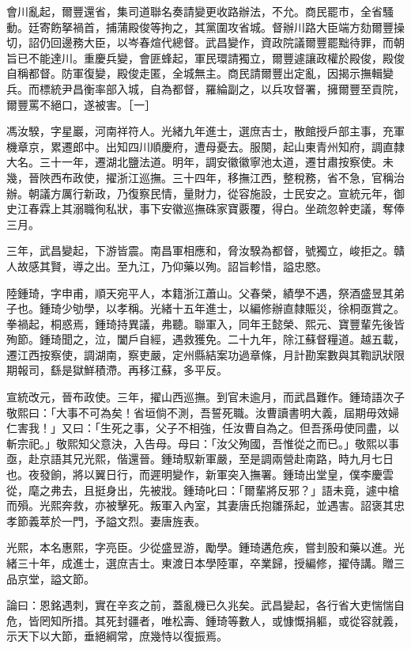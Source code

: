 \begin{pinyinscope}
會川亂起，爾豐還省，集司道聯名奏請變更收路辦法，不允。商民罷市，全省騷動。廷寄飭拏禍首，捕蒲殿俊等拘之，其黨圍攻省城。督辦川路大臣端方劾爾豐操切，詔仍回邊務大臣，以岑春煊代總督。武昌變作，資政院議爾豐罷黜待罪，而朝旨已不能達川。重慶兵變，會匪蜂起，軍民環請獨立，爾豐遽讓政權於殿俊，殿俊自稱都督。防軍復變，殿俊走匿，全城無主。商民請爾豐出定亂，因揭示撫輯變兵。而標統尹昌衡率部入城，自為都督，羅綸副之，以兵攻督署，擁爾豐至貢院，爾豐罵不絕口，遂被害。［一］

馮汝騤，字星巖，河南祥符人。光緒九年進士，選庶吉士，散館授戶部主事，充軍機章京，累遷郎中。出知四川順慶府，遭母憂去。服闋，起山東青州知府，調直隸大名。三十一年，遷湖北鹽法道。明年，調安徽徽寧池太道，遷甘肅按察使。未幾，晉陜西布政使，擢浙江巡撫。三十四年，移撫江西，整稅務，省不急，官稱治辦。朝議方厲行新政，乃復察民情，量財力，從容施設，士民安之。宣統元年，御史江春霖上其溺職徇私狀，事下安徽巡撫硃家寶覈覆，得白。坐疏忽幹吏議，奪俸三月。

三年，武昌變起，下游皆震。南昌軍相應和，脅汝騤為都督，號獨立，峻拒之。贛人故感其賢，導之出。至九江，乃仰藥以殉。詔旨軫惜，謚忠愍。

陸鍾琦，字申甫，順天宛平人，本籍浙江蕭山。父春榮，績學不遇，祭酒盛昱其弟子也。鍾琦少劬學，以孝稱。光緒十五年進士，以編修辦直隸賑災，徐桐亟賞之。拳禍起，桐惑焉，鍾琦持異議，弗聽。聯軍入，同年王懿榮、熙元、寶豐輩先後皆殉節。鍾琦聞之，泣，闔戶自經，遇救獲免。二十九年，除江蘇督糧道。越五載，遷江西按察使，調湖南，察吏嚴，定州縣結案功過章條，月計勘案數與其鞫訊狀限期報司，繇是獄鮮積滯。再移江蘇，多平反。

宣統改元，晉布政使。三年，擢山西巡撫。到官未逾月，而武昌難作。鍾琦語次子敬熙曰：「大事不可為矣！省垣倘不測，吾誓死職。汝曹讀書明大義，屆期毋效婦仁害我！」又曰：「生死之事，父子不相強，任汝曹自為之。但吾孫毋使同盡，以斬宗祀。」敬熙知父意決，入告母。母曰：「汝父殉國，吾惟從之而已。」敬熙以事亟，赴京語其兄光熙，偕還晉。鍾琦馭新軍嚴，至是調兩營赴南路，時九月七日也。夜發餉，將以翼日行，而遲明變作，新軍突入撫署。鍾琦出堂皇，僕李慶雲從，麾之弗去，且挺身出，先被戕。鍾琦叱曰：「爾輩將反邪？」語未竟，遽中槍而殞。光熙奔救，亦被擊死。叛軍入內室，其妻唐氏抱雛孫起，並遇害。詔褒其忠孝節義萃於一門，予謚文烈。妻唐旌表。

光熙，本名惠熙，字亮臣。少從盛昱游，勵學。鍾琦遘危疾，嘗刲股和藥以進。光緒三十年，成進士，選庶吉士。東渡日本學陸軍，卒業歸，授編修，擢侍講。贈三品京堂，謚文節。

論曰：恩銘遇刺，實在辛亥之前，蓋亂機已久兆矣。武昌變起，各行省大吏惴惴自危，皆罔知所措。其死封疆者，唯松壽、鍾琦等數人，或慷慨捐軀，或從容就義，示天下以大節，垂絕綱常，庶幾恃以復振焉。


\end{pinyinscope}
